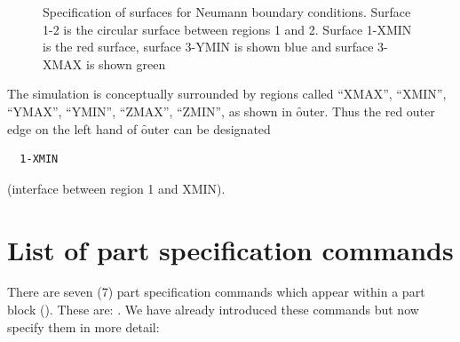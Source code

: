 \documentclass[a4paper,twoside,11pt]{book}
\begin{document}
\begin{figure}
  \caption{Specification of surfaces for Neumann boundary
    conditions. Surface 1-2 is the circular surface between regions 1
    and 2. Surface 1-XMIN is the red surface, surface 3-YMIN is shown
    blue and surface 3-XMAX is shown green}
  \label{outer}
\end{figure}

The simulation is conceptually surrounded by regions called
``XMAX'', ``XMIN'', ``YMAX'', ``YMIN'', ``ZMAX'', ``ZMIN'', as shown
in \f{outer}. Thus the red outer edge on the left hand of \f{outer}
can be designated
\begin{verbatim}
  1-XMIN
\end{verbatim}
(interface between region 1 and XMIN).

\section{List of part specification commands}

There are seven (7) part specification commands which appear within a part
block (). These are: . We have already introduced these
commands but now specify them in more detail:
\end{document}
